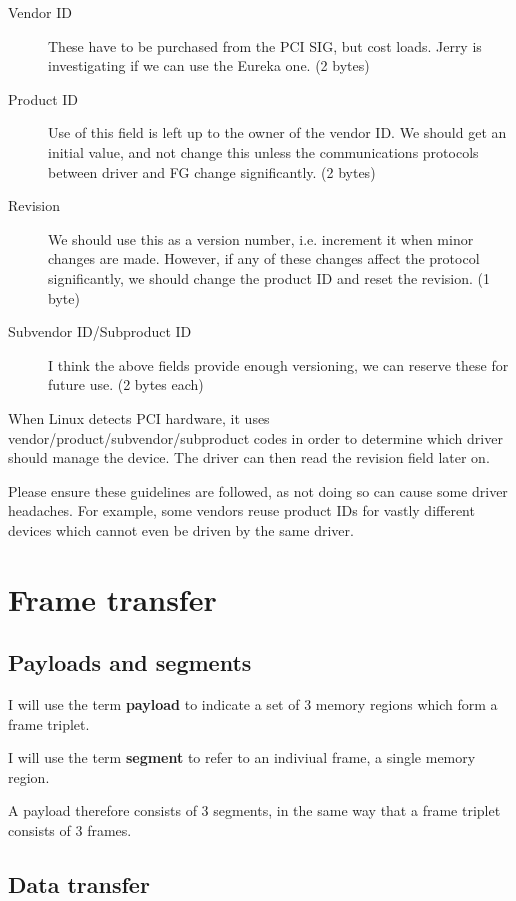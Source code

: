 \documentclass[12pt]{article}
\begin{document}
\begin{description}
\item[Vendor ID] These have to be purchased from the PCI SIG, but cost loads. Jerry is investigating if we can use the Eureka one. (2 bytes)
\item[Product ID] Use of this field is left up to the owner of the vendor ID. We should get an initial value, and not change this unless the communications protocols between driver and FG change significantly. (2 bytes)
\item[Revision] We should use this as a version number, i.e. increment it when minor changes are made. However, if any of these changes affect the protocol significantly, we should change the product ID and reset the revision. (1 byte)
\item[Subvendor ID/Subproduct ID] I think the above fields provide enough versioning, we can reserve these for future use. (2 bytes each)
\end{description}

When Linux detects PCI hardware, it uses vendor/product/subvendor/subproduct codes in order to determine which driver should manage the device. The driver can then read the revision field later on.

Please ensure these guidelines are followed, as not doing so can cause some driver headaches. For example, some vendors reuse product IDs for vastly different devices which cannot even be driven by the same driver.

\section{Frame transfer}

\subsection{Payloads and segments}

I will use the term \textbf{payload} to indicate a set of 3 memory regions which form a frame triplet.

I will use the term \textbf{segment} to refer to an indiviual frame, a single memory region.

A payload therefore consists of 3 segments, in the same way that a frame triplet consists of 3 frames.

\subsection{Data transfer}
\end{document}
